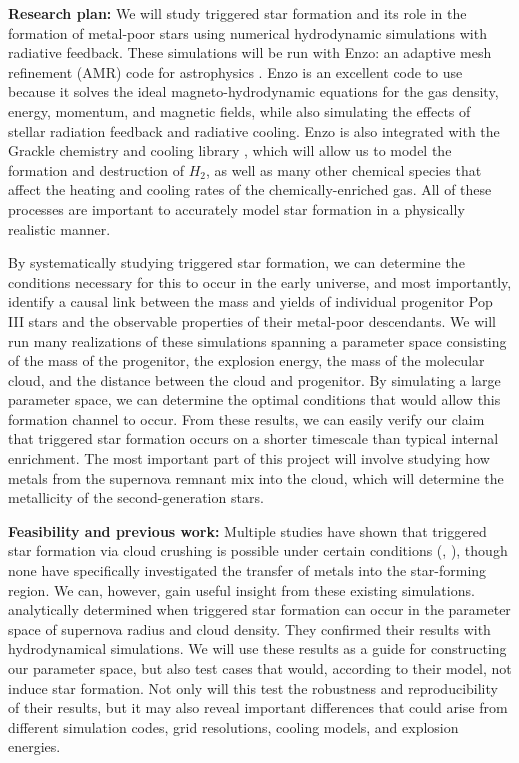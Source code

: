 \documentclass[letterpaper, 12pt]{article}
\begin{document}
\textbf{Research plan:} We will study triggered star formation and its role in the formation of metal-poor stars using numerical hydrodynamic simulations with radiative feedback. These simulations will be run with Enzo: an adaptive mesh refinement (AMR) code for astrophysics \citep{Bryan2014}. Enzo is an excellent code to use because it solves the ideal magneto-hydrodynamic equations for the gas density, energy, momentum, and magnetic fields, while also simulating the effects of stellar radiation feedback and radiative cooling. Enzo is also integrated with the Grackle chemistry and cooling library \citep{Smith2017}, which will allow us to model the formation and destruction of $H_2$, as well as many other chemical species that affect the heating and cooling rates of the chemically-enriched gas. All of these processes are important to accurately model star formation in a physically realistic manner. 

By systematically studying triggered star formation, we can determine the conditions necessary for this to occur in the early universe, and most importantly, identify a causal link between the mass and yields of individual progenitor Pop III stars and the observable properties of their metal-poor descendants. We will run many realizations of these simulations spanning a parameter space consisting of the mass of the progenitor, the explosion energy, the mass of the molecular cloud, and the distance between the cloud and progenitor. By simulating a large parameter space, we can determine the optimal conditions that would allow this formation channel to occur. From these results, we can easily verify our claim that triggered star formation occurs on a shorter timescale than typical internal enrichment. The most important part of this project will involve studying how metals from the supernova remnant mix into the cloud, which will determine the metallicity of the second-generation stars.

\textbf{Feasibility and previous work:} Multiple studies have shown that triggered star formation via cloud crushing is possible under certain conditions (\cite{Melioli2006}, \cite{Leao2009}), though none have specifically investigated the transfer of metals into the star-forming region. We can, however, gain useful insight from these existing simulations. \cite{Melioli2006} analytically determined when triggered star formation can occur in the parameter space of supernova radius and cloud density. They confirmed their results with hydrodynamical simulations. We will use these results as a guide for constructing our parameter space, but also test cases that would, according to their model, not induce star formation. Not only will this test the robustness and reproducibility of their results, but it may also reveal important differences that could arise from different simulation codes, grid resolutions, cooling models, and explosion energies.
\end{document}
